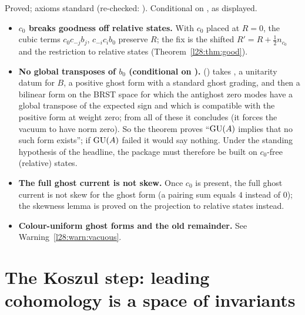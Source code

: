 \begin{status}
Proved; axioms standard (re-checked: ). Conditional on , as displayed.
\end{status}

\begin{warning}[title={Dead ends in the concrete package}]\label{l28:warn:package}
\begin{itemize}
\item \textbf{$c_0$ breaks goodness off relative states.} With $c_0$ placed at $R=0$, the cubic terms $c_0c_{-j}b_j$, $c_{-i}c_ib_0$ preserve $R$; the
  fix is the shifted $R'=R+\tfrac12n_{c_0}$ and the restriction to relative states (Theorem~\ref{l28:thm:good}).
\item \textbf{No global transposes of $b_0$ (conditional on ).} 
  () takes , a unitarity datum  for $B$, a positive ghost form with a standard
  ghost grading, and then a bilinear form on the BRST space for which the antighost zero modes have a global transpose of the expected sign and
  which is compatible with the positive form at weight zero; from all of these it concludes  (it forces the vacuum to have norm
  zero). So the theorem proves ``$\mathrm{GU}(A)$ implies that no such form exists''; if $\mathrm{GU}(A)$ failed it would say nothing. Under
  the standing hypothesis of the headline, the package must therefore be built on $c_0$-free (relative) states.
\item \textbf{The full ghost current is not skew.} Once $c_0$ is present, the full ghost current is not skew for the ghost form (a pairing sum equals
  $4$ instead of $0$); the skewness lemma is proved on the projection to relative states instead.
\item \textbf{Colour-uniform ghost forms and the old remainder.} See Warning~\ref{l28:warn:vacuous}.
\end{itemize}
\end{warning}

\section{The Koszul step: leading cohomology is a space of invariants}\label{l28:sec:koszul}

